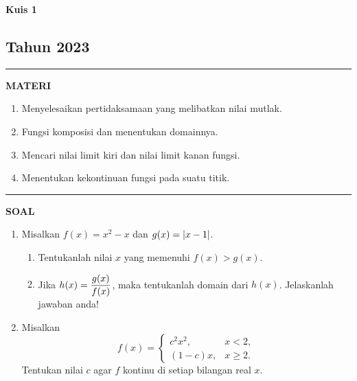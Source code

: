 \begin{flushright}
    \textbf{\Large{Kuis 1}}
    \subsection*{Tahun 2023}
\end{flushright}


\vspace{0.5cm}\hrule height 2pt\vspace{0.5cm}


\begin{center}
\textbf{\large{MATERI}}
\begin{enumerate}[leftmargin=*, label={\arabic*}.]
\item Menyelesaikan pertidaksamaan yang melibatkan nilai mutlak.
\item Fungsi komposisi dan menentukan domainnya.
\item Mencari nilai limit kiri dan nilai limit kanan fungsi.
\item Menentukan kekontinuan fungsi pada suatu titik.
\end{enumerate}
\end{center}


\vspace{0.2cm}\hrule height 1pt\vspace{0.5cm}


\begin{center}
\textbf{\large{SOAL}}
\end{center}
\begin{enumerate}[leftmargin=*, label={\arabic*}.]
\item Misalkan $f(x) = x^{2}-x$ dan $g(x)=\lvert x-1\rvert$.
    \begin{enumerate}[label={\alph*}.]
    \item Tentukanlah nilai $x$ yang memenuhi $f(x) > g(x)$.
    \item Jika $\displaystyle h(x) = \frac{g(x)}{f(x)}$, maka tentukanlah 
    domain dari $h(x)$. Jelaskanlah jawaban anda!
    \end{enumerate}
\item Misalkan
\[
    f(x) =
    \begin{cases}
        c^{2}x^{2}, &{x < 2},\\
        (1-c)x, &{x \geq 2}.
    \end{cases}
\]
Tentukan nilai $c$ agar $f$ kontinu di setiap bilangan real $x$.
\end{enumerate}


